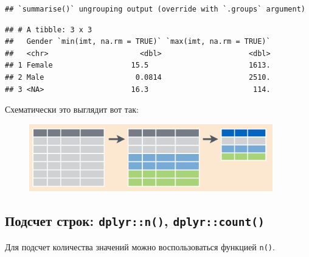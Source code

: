 \documentclass[]{book}
\newenvironment{Shaded}{\begin{snugshade}}{\end{snugshade}}
\newcommand{\KeywordTok}[1]{\textcolor[rgb]{0.13,0.29,0.53}{\textbf{#1}}}
\newcommand{\DataTypeTok}[1]{\textcolor[rgb]{0.13,0.29,0.53}{#1}}
\newcommand{\DecValTok}[1]{\textcolor[rgb]{0.00,0.00,0.81}{#1}}
\newcommand{\StringTok}[1]{\textcolor[rgb]{0.31,0.60,0.02}{#1}}
\newcommand{\OtherTok}[1]{\textcolor[rgb]{0.56,0.35,0.01}{#1}}
\newcommand{\OperatorTok}[1]{\textcolor[rgb]{0.81,0.36,0.00}{\textbf{#1}}}
\newcommand{\NormalTok}[1]{#1}
\begin{document}
\begin{Shaded}
\end{Shaded}

\begin{verbatim}
## `summarise()` ungrouping output (override with `.groups` argument)
\end{verbatim}

\begin{verbatim}
## # A tibble: 3 x 3
##   Gender `min(imt, na.rm = TRUE)` `max(imt, na.rm = TRUE)`
##   <chr>                     <dbl>                    <dbl>
## 1 Female                  15.5                       1613.
## 2 Male                     0.0814                    2510.
## 3 <NA>                    16.3                        114.
\end{verbatim}

Схематически это выглядит вот так:

\begin{figure}
\centering
\includegraphics[width=4.16667in]{images/group_by_s.png}
\caption{}
\end{figure}

\subsection{\texorpdfstring{Подсчет строк: \texttt{dplyr::n()},
\texttt{dplyr::count()}}{Подсчет строк: dplyr::n(), dplyr::count()}}\label{tidy_count}

Для подсчет количества значений можно воспользоваться функцией
\texttt{n()}.
\end{document}
